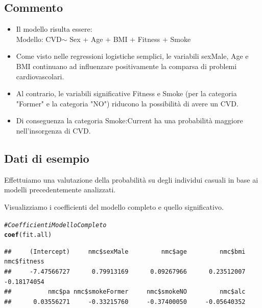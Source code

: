 \documentclass{article}\usepackage[]{graphicx}\usepackage[]{xcolor}
\makeatletter
\newcommand{\hlcom}[1]{\textcolor[rgb]{0.678,0.584,0.686}{\textit{#1}}}%
\newcommand{\hlstd}[1]{\textcolor[rgb]{0.345,0.345,0.345}{#1}}%
\newcommand{\hlkwd}[1]{\textcolor[rgb]{0.737,0.353,0.396}{\textbf{#1}}}%
\newenvironment{kframe}{%
 \def\at@end@of@kframe{}%
 \ifinner\ifhmode%
  \def\at@end@of@kframe{\end{minipage}}%
  \begin{minipage}{\columnwidth}%
 \fi\fi%
 \def\FrameCommand##1{\hskip\@totalleftmargin \hskip-\fboxsep
 \colorbox{shadecolor}{##1}\hskip-\fboxsep
     \hskip-\linewidth \hskip-\@totalleftmargin \hskip\columnwidth}%
 \MakeFramed {\advance\hsize-\width
   \@totalleftmargin\z@ \linewidth\hsize
   \@setminipage}}%
 {\par\unskip\endMakeFramed%
 \at@end@of@kframe}
\newenvironment{knitrout}{}{} %
\makeatother
\begin{document}
  \subsection{Commento}
    \begin{itemize}
      \item Il modello risulta essere: \\
            Modello: CVD$\sim$ Sex + Age + BMI + Fitness + Smoke
      \item Come visto nelle regressioni logistiche semplici, le variabili
            sexMale, Age e BMI continuano ad influenzare positivamente la 
            comparsa di problemi cardiovascolari.
      \item Al contrario, le variabili significative Fitness e Smoke (per la 
            categoria "Former" e la categoria "NO") riducono la possibilità di 
            avere un CVD.
      \item Di conseguenza la categoria Smoke:Current ha una probabilità 
            maggiore nell'insorgenza di CVD.
    \end{itemize}
  
  \subsection{Dati di esempio}
    Effettuiamo una valutazione della probabilità su degli individui casuali 
    in base ai modelli precedentemente analizzati. \par
    Visualizziamo i coefficienti del modello completo e quello significativo.
    
\begin{knitrout}
\color{fgcolor}\begin{kframe}
\begin{alltt}
\hlcom{#Coefficienti Modello Completo}
\hlkwd{coef}\hlstd{(fit.all)}
\end{alltt}
\begin{verbatim}
##     (Intercept)     nmc$sexMale         nmc$age         nmc$bmi     nmc$fitness 
##     -7.47566727      0.79913169      0.09267966      0.23512007     -0.18174054 
##          nmc$pa nmc$smokeFormer     nmc$smokeNO         nmc$alc 
##      0.03556271     -0.33215760     -0.37400050     -0.05640352
\end{verbatim}
\end{kframe}
\end{knitrout}
    
\end{document}
